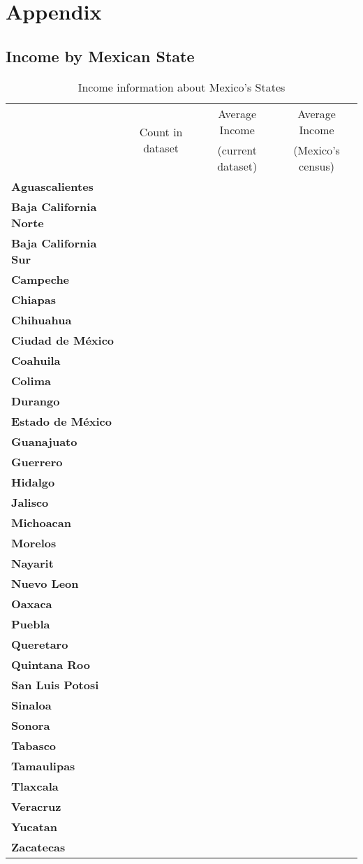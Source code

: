 \section{Appendix}

\subsection{Income by Mexican State}

\begin{table}[th!]
\centering
\begin{tabular}{>{\bfseries}l c c c}
\toprule
\multirow{2}{*}{State} & \multirow{2}{*}{Count in dataset} & Average Income & Average Income \\
& & (current dataset) & (Mexico's census) \\
\midrule
Aguascalientes & & & \\
Baja California Norte & & & \\
Baja California Sur & & & \\
Campeche & & & \\
Chiapas & & & \\
Chihuahua & & & \\
Ciudad de México & & & \\
Coahuila & & & \\
Colima & & & \\
Durango & & & \\
Estado de México & & & \\
Guanajuato & & & \\
Guerrero & & & \\
Hidalgo & & & \\
Jalisco & & & \\
Michoacan & & & \\
Morelos & & & \\
Nayarit & & & \\
Nuevo Leon & & & \\
Oaxaca & & & \\
Puebla & & & \\
Queretaro & & & \\
Quintana Roo & & & \\
San Luis Potosi & & & \\
Sinaloa & & & \\
Sonora & & & \\
Tabasco & & & \\
Tamaulipas & & & \\
Tlaxcala & & & \\
Veracruz & & & \\
Yucatan & & & \\
Zacatecas & & & \\
\bottomrule
\end{tabular}
\caption{Income information about Mexico's States }
\label{tab:regions}
\end{table}
